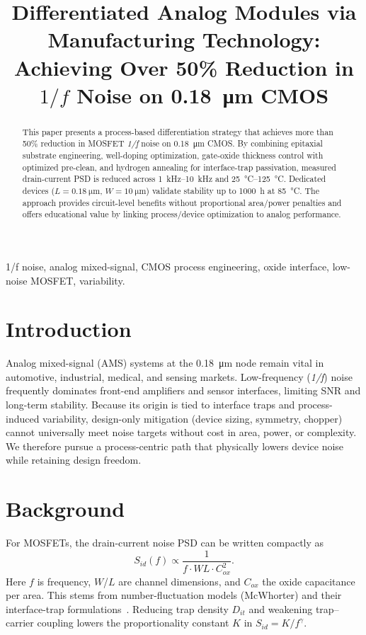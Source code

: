 \documentclass[conference]{IEEEtran}
\title{Differentiated Analog Modules via Manufacturing Technology:\\
Achieving Over 50\% Reduction in $1/f$ Noise on \SI{0.18}{\um} CMOS}
\author{
\IEEEauthorblockN{Shinichi Samizo}
\IEEEauthorblockA{Independent Semiconductor Researcher\\
Project Design Hub, Samizo--AITL\\
\textit{Email:} \href{mailto:shin3t72@gmail.com}{shin3t72@gmail.com}\quad
\textit{GitHub:} \href{https://github.com/Samizo-AITL}{Samizo-AITL}}
}
\begin{document}
\maketitle

\begin{abstract}
This paper presents a process-based differentiation strategy that achieves more than 50\% reduction in MOSFET \emph{1/f} noise on \SI{0.18}{\um} CMOS. By combining epitaxial substrate engineering, well-doping optimization, gate-oxide thickness control with optimized pre-clean, and hydrogen annealing for interface-trap passivation, measured drain-current PSD is reduced across \SIrange{1}{10}{\kilo\hertz} and \SIrange{25}{125}{\celsius}. Dedicated devices ($L=\SI{0.18}{\um}$, $W=\SI{10}{\um}$) validate stability up to 1000~h at \SI{85}{\celsius}. The approach provides circuit-level benefits without proportional area/power penalties and offers educational value by linking process/device optimization to analog performance.
\end{abstract}

\begin{IEEEkeywords}
1/f noise, analog mixed-signal, CMOS process engineering, oxide interface, low-noise MOSFET, variability.
\end{IEEEkeywords}

\section{Introduction}
Analog mixed-signal (AMS) systems at the \SI{0.18}{\um} node remain vital in automotive, industrial, medical, and sensing markets. Low-frequency (\emph{1/f}) noise frequently dominates front-end amplifiers and sensor interfaces, limiting SNR and long-term stability. Because its origin is tied to interface traps and process-induced variability, design-only mitigation (device sizing, symmetry, chopper) cannot universally meet noise targets without cost in area, power, or complexity. We therefore pursue a process-centric path that physically lowers device noise while retaining design freedom.

\section{Background}
For MOSFETs, the drain-current noise PSD can be written compactly as
\begin{equation}
  S_{id}(f) \propto \frac{1}{f \cdot W L \cdot C_{ox}^{2}}.
\end{equation}
Here $f$ is frequency, $W$/$L$ are channel dimensions, and $C_{ox}$ the oxide capacitance per area. This stems from number-fluctuation models (McWhorter) and their interface-trap formulations~\cite{Takeda,Ghibaudo}. Reducing trap density $D_{it}$ and weakening trap--carrier coupling lowers the proportionality constant $K$ in $S_{id}=K/f^{\gamma}$.
\end{document}
